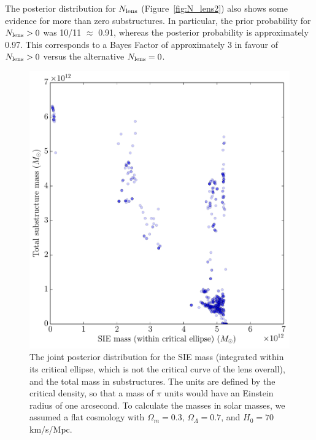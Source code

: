 \documentclass[useAMS,usenatbib]{mn2e}
\begin{document}
The posterior distribution for
$N_{\rm lens}$ (Figure~\ref{fig:N_lens2})
also shows some evidence for more than zero substructures.
In particular, the prior probability for $N_{\rm lens} > 0$ was 10/11
$\approx$ 0.91, whereas the posterior probability is approximately 0.97.
This corresponds to a Bayes Factor of approximately 3 in favour of
$N_{\rm lens} > 0$ versus the alternative $N_{\rm lens} = 0$.

\begin{figure}
\begin{center}
\includegraphics[scale=0.4]{masses2.pdf}
\caption{The joint posterior distribution for the SIE mass (integrated within
its critical ellipse, which is not the critical curve of the lens overall),
and the total mass in substructures. The units are defined by the critical
density, so that a mass of $\pi$ units would have an Einstein radius of one arcsecond. To calculate the masses in solar masses, we assumed a flat cosmology with
$\Omega_m=0.3$, $\Omega_\Lambda=0.7$, and
$H_0=70$ km/s/Mpc.
\label{fig:masses2}}
\end{center}
\end{figure}
\end{document}
